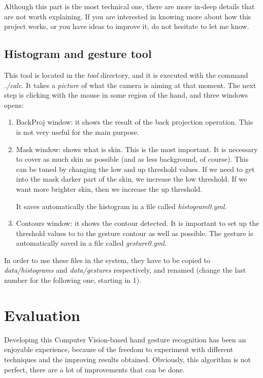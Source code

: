 \documentclass[11pt,a4paper]{article}
\begin{document}
Although this part is the most technical one, there are more in-deep details that are not worth explaining. If you are interested in knowing more about how this project works, or you have ideas to improve it, do not hesitate to let me know.

\label{tool}
\subsection{Histogram and gesture tool}
This tool is located in the \textit{tool} directory, and it is executed with the command \textit{./calc}. It takes a \textit{picture} of what the camera is aiming at that moment. The next step is clicking with the mouse in some region of the hand, and three windows opens:
\begin{enumerate}
\item BackProj window: it shows the result of the back projection operation. This is not very useful for the main purpose.
\item Mask window: shows what is skin. This is the most important. It is necessary to cover as much skin as possible (and as less background, of course). This can be tuned by changing the low and up threshold values. If we need to get into the mask darker part of the skin, we increase the low threshold. If we want more brighter skin, then we increase the up threshold.

It saves automatically the histogram in a file called \textit{histogram0.yml}.

\item Contours window: it shows the contour detected. It is important to set up the threshold values to to the gesture contour as well as possible. The gesture is automatically saved in a file called \textit{gesture0.yml}.
\end{enumerate}

In order to use these files in the system, they have to be copied to \textit{data/histograms} and \textit{data/gestures} respectively, and renamed (change the last number for the following one, starting in 1).



\section{Evaluation}

Developing this Computer Vision-based hand gesture recognition has been an enjoyable experience, because of the freedom to experiment with different techniques and the improving results obtained. Obviously, this algorithm is not perfect, there are a lot of improvements that can be done.\\
\end{document}
